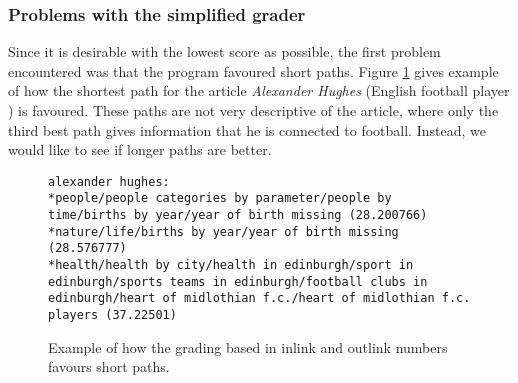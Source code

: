 \subsubsection{Problems with the simplified grader}
Since it is desirable with the lowest score as possible, the first problem encountered was that the program favoured short paths. Figure \ref{fig:short_path_favour} gives example of how the shortest path for the article \emph{Alexander Hughes} (English football player  \cite{wiki:alexanderhughes}) is favoured. These paths are not very descriptive of the article, where only the third best path gives information that he is connected to football. Instead, we would like to see if longer paths are better. 

\begin{comment}
\begin{figure}[h]
\centering
\begin{lstlisting}
argentines of serb descent:
* humans/ethnic groups/ethnology/ethnicity stubs/ (27.824755)
* culture/ethnicity/ethnicity stubs/ (29.704807)
* society/ethnicity/ethnicity stubs/ (34.592939)
\end{lstlisting}
\caption
\label{fig:short_path_favour}
\end{figure}


Problem med Alexander Huges: han er fotballspiller og dette kommer ikke så godt fra. 

asd.,kas.kdfj

\end{comment}

\begin{figure}[h]
\centering
\begin{lstlisting}
alexander hughes:
*people/people categories by parameter/people by time/births by year/year of birth missing (28.200766)
*nature/life/births by year/year of birth missing (28.576777)
*health/health by city/health in edinburgh/sport in edinburgh/sports teams in edinburgh/football clubs in edinburgh/heart of midlothian f.c./heart of midlothian f.c. players (37.22501)
\end{lstlisting}
\caption[Grading favouring short paths]{Example of how the grading based in inlink and outlink numbers favours short paths.}
\label{fig:short_path_favour}
\end{figure}
